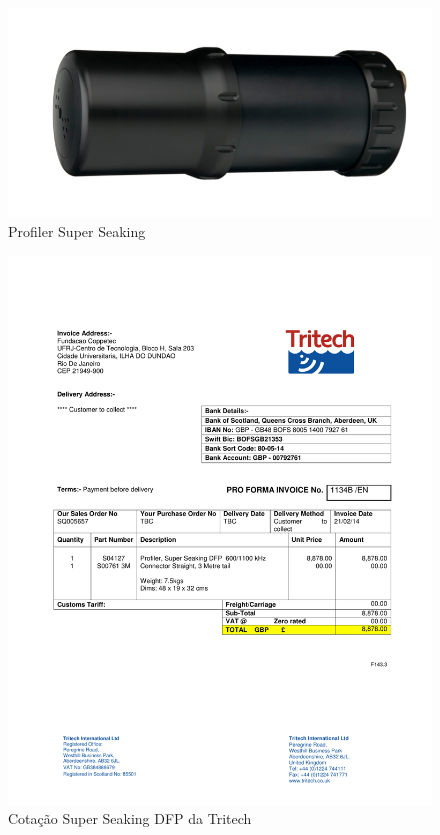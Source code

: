 \newpage

\begin{figure}[h!]
 \centering
 \includegraphics[width=1\columnwidth]{Seaking_Profiler/foto.pdf}
 \caption{Profiler Super Seaking}
\end{figure}

\newpage

\begin{figure}[h!]
 \centering
 \includegraphics[width=1\columnwidth]{Seaking_profiler/price_quote_0.pdf}
 \caption{Cotação Super Seaking DFP da Tritech}
  
\end{figure}

